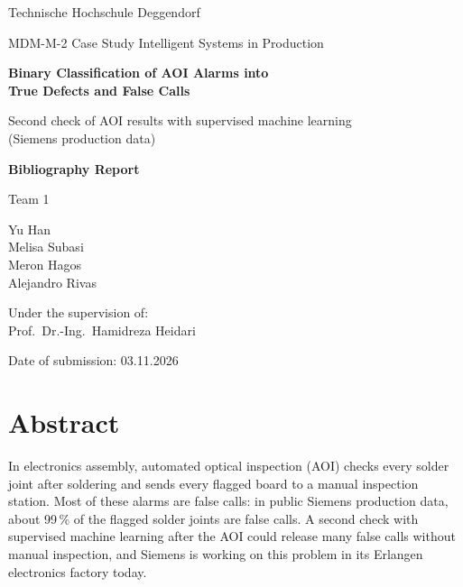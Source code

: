 \documentclass[11pt,a4paper]{article}
\begin{document}
\begin{titlepage}
\centering
{\large Technische Hochschule Deggendorf\par}
\vspace{1.2cm}
{\large MDM-M-2 Case Study Intelligent Systems in Production\par}
\vspace{2cm}
{\LARGE\bfseries Binary Classification of AOI Alarms into\\[4pt] True Defects and False Calls\par}
\vspace{0.4cm}
{\large Second check of AOI results with supervised machine learning\\(Siemens production data)\par}
\vspace{1.5cm}
{\Large\bfseries Bibliography Report\par}
\vspace{2cm}
{\large Team 1\par}
\vspace{0.3cm}
Yu Han\\
Melisa Subasi\\
Meron Hagos\\
Alejandro Rivas\par
\vspace{1.5cm}
Under the supervision of:\\
Prof.\ Dr.-Ing.\ Hamidreza Heidari\par
\vspace{0.6cm}
Date of submission: 03.11.2026\par
\vfill
\end{titlepage}

\section*{Abstract}
In electronics assembly, automated optical inspection (AOI) checks every solder joint after soldering and sends every flagged board to a manual inspection station. Most of these alarms are false calls: in public Siemens production data, about 99\,\% of the flagged solder joints are false calls. A second check with supervised machine learning after the AOI could release many false calls without manual inspection, and Siemens is working on this problem in its Erlangen electronics factory today.
\end{document}

